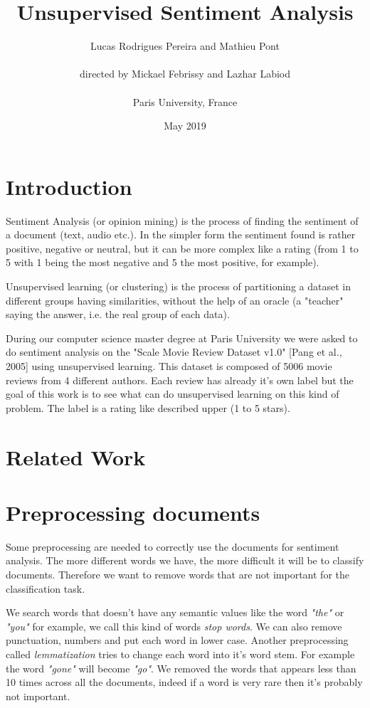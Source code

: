 \documentclass{article}
\title{Unsupervised Sentiment Analysis}
\author{Lucas Rodrigues Pereira and Mathieu Pont\\\\directed by Mickael Febrissy and Lazhar Labiod\\\\Paris University, France}
\date{May 2019}
\begin{document}
\maketitle






\section{Introduction}

Sentiment Analysis (or opinion mining) is the process of finding the sentiment of a document (text, audio etc.). In the simpler form the sentiment found is rather positive, negative or neutral, but it can be more complex like a rating (from 1 to 5 with 1 being the most negative and 5 the most positive, for example).

Unsupervised learning (or clustering) is the process of partitioning a dataset in different groups having similarities, without the help of an oracle (a "teacher" saying the answer, i.e. the real group of each data).

During our computer science master degree at Paris University we were asked
to do sentiment analysis on the "Scale Movie Review Dataset v1.0" [Pang et al., 2005] using unsupervised learning. This dataset is composed of 5006 movie reviews from 4 different authors. Each review has already it's own label but the goal of this work is to see what can do unsupervised learning on this kind of problem. The label is a rating like described upper (1 to 5 stars).



\section{Related Work}



\section{Preprocessing documents}

Some preprocessing are needed to correctly use the documents for sentiment analysis. The more different words we have, the more difficult it will be to classify documents. Therefore we want to remove words that are not important for the classification task. 

We search words that doesn't have any semantic values like the word \textit{"the"} or \textit{"you"} for example, we call this kind of words \textit{stop words}. We can also remove punctuation, numbers and put each word in lower case. Another preprocessing called \textit{lemmatization} tries to change each word into it's word stem. For example the word \textit{"gone"} will become \textit{"go"}. We removed the words that appears less than 10 times across all the documents, indeed if a word is very rare then it's probably not important.
\end{document}
